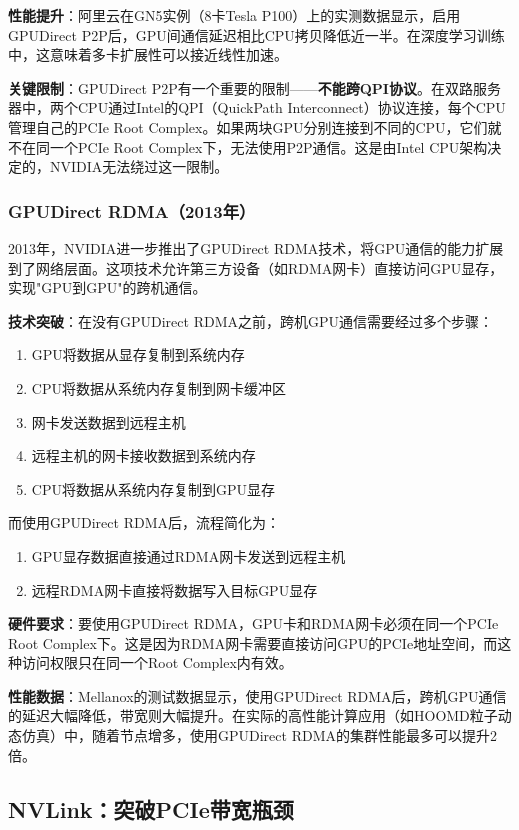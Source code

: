 \textbf{性能提升}：阿里云在GN5实例（8卡Tesla P100）上的实测数据显示，启用GPUDirect P2P后，GPU间通信延迟相比CPU拷贝降低近一半。在深度学习训练中，这意味着多卡扩展性可以接近线性加速。

\textbf{关键限制}：GPUDirect P2P有一个重要的限制——\textbf{不能跨QPI协议}。在双路服务器中，两个CPU通过Intel的QPI（QuickPath Interconnect）协议连接，每个CPU管理自己的PCIe Root Complex。如果两块GPU分别连接到不同的CPU，它们就不在同一个PCIe Root Complex下，无法使用P2P通信。这是由Intel CPU架构决定的，NVIDIA无法绕过这一限制。

\subsubsection{GPUDirect RDMA（2013年）}

2013年，NVIDIA进一步推出了GPUDirect RDMA技术，将GPU通信的能力扩展到了网络层面。这项技术允许第三方设备（如RDMA网卡）直接访问GPU显存，实现"GPU到GPU"的跨机通信。

\textbf{技术突破}：在没有GPUDirect RDMA之前，跨机GPU通信需要经过多个步骤：
\begin{enumerate}
    \item GPU将数据从显存复制到系统内存
    \item CPU将数据从系统内存复制到网卡缓冲区
    \item 网卡发送数据到远程主机
    \item 远程主机的网卡接收数据到系统内存
    \item CPU将数据从系统内存复制到GPU显存
\end{enumerate}

而使用GPUDirect RDMA后，流程简化为：
\begin{enumerate}
    \item GPU显存数据直接通过RDMA网卡发送到远程主机
    \item 远程RDMA网卡直接将数据写入目标GPU显存
\end{enumerate}

\textbf{硬件要求}：要使用GPUDirect RDMA，GPU卡和RDMA网卡必须在同一个PCIe Root Complex下。这是因为RDMA网卡需要直接访问GPU的PCIe地址空间，而这种访问权限只在同一个Root Complex内有效。

\textbf{性能数据}：Mellanox的测试数据显示，使用GPUDirect RDMA后，跨机GPU通信的延迟大幅降低，带宽则大幅提升。在实际的高性能计算应用（如HOOMD粒子动态仿真）中，随着节点增多，使用GPUDirect RDMA的集群性能最多可以提升2倍。

\subsection{NVLink：突破PCIe带宽瓶颈}

